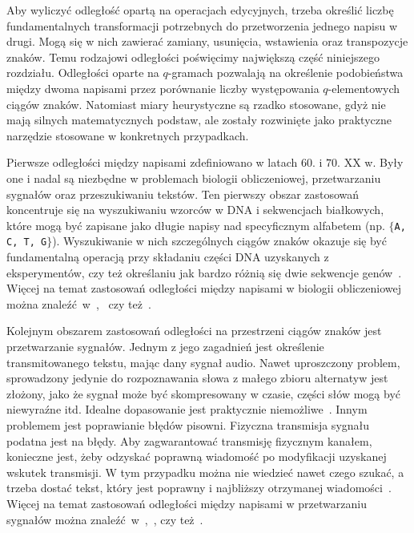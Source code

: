 \documentclass{praca1}
\begin{document}
Aby wyliczyć odległość opartą na operacjach edycyjnych, trzeba określić liczbę fundamentalnych transformacji potrzebnych do przetworzenia jednego napisu w drugi. Mogą się w nich zawierać zamiany, usunięcia, wstawienia oraz transpozycje znaków. Temu rodzajowi odległości poświęcimy największą część niniejszego rozdziału. Odległości oparte na $q$-gramach pozwalają na określenie podobieństwa między dwoma napisami przez porównanie liczby występowania $q$-elementowych ciągów znaków. Natomiast miary heurystyczne są rzadko stosowane, gdyż nie mają silnych matematycznych podstaw, ale zostały rozwinięte jako praktyczne narzędzie stosowane w konkretnych przypadkach. 

Pierwsze odległości między napisami zdefiniowano w latach $60.$ i $70.$ XX w. Były one i nadal są niezbędne w problemach biologii obliczeniowej, przetwarzaniu sygnałów oraz przeszukiwaniu tekstów. Ten pierwszy obszar zastosowań koncentruje się na wyszukiwaniu wzorców w DNA i sekwencjach białkowych, które mogą być zapisane jako długie napisy nad specyficznym alfabetem (np. $\{$\verb|A, C, T, G|$\}$). Wyszukiwanie w nich szczególnych ciągów znaków okazuje się być fundamentalną operacją przy składaniu części DNA uzyskanych z eksperymentów, czy też określaniu jak bardzo różnią się dwie sekwencje genów~\cite{Navarro2001:guidedtour}. Więcej na temat zastosowań odległości między napisami w biologii obliczeniowej można znaleźć~w~\cite{Sellers1980:evolutionary},~\cite{Needleman1970:proteins} czy też~\cite{Sankoff1983:timewarps}. 

Kolejnym obszarem zastosowań odległości na przestrzeni ciągów znaków jest przetwarzanie sygnałów. Jednym z jego zagadnień jest określenie transmitowanego tekstu, mając dany sygnał audio. Nawet uproszczony problem, sprowadzony jedynie do rozpoznawania słowa z małego zbioru alternatyw jest złożony, jako że sygnał może być skompresowany w czasie, części słów mogą być niewyraźne itd. Idealne dopasowanie jest praktycznie niemożliwe~\cite{Navarro2001:guidedtour}. Innym problemem jest poprawianie błędów pisowni. Fizyczna transmisja sygnału podatna jest na błędy. Aby zagwarantować transmisję fizycznym kanałem, konieczne jest, żeby odzyskać poprawną wiadomość po modyfikacji uzyskanej wskutek transmisji. W tym przypadku można nie wiedzieć nawet czego szukać, a trzeba dostać tekst, który jest poprawny i najbliższy otrzymanej wiadomości~\cite{Navarro2001:guidedtour}. Więcej na temat zastosowań odległości między napisami w przetwarzaniu sygnałów można znaleźć~w~\cite{Levenshtein1965:binarycodes},~\cite{Vintsyuk1968:speech}, czy też~\cite{Dixon1979:automatic}.
\end{document}
